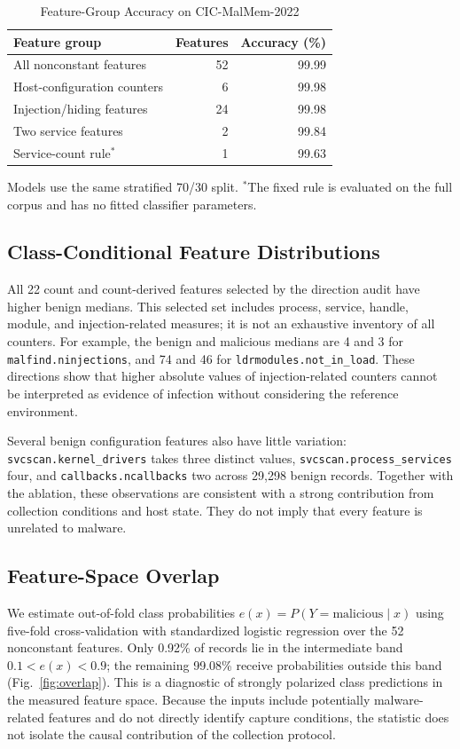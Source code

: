 \documentclass[conference]{IEEEtran}
\begin{document}
\begin{table}[t]
\caption{Feature-Group Accuracy on CIC-MalMem-2022}
\label{tab:ablation}
\centering
\small
\begin{tabular}{@{}lrr@{}}
\toprule
Feature group & Features & Accuracy (\%) \\
\midrule
All nonconstant features & 52 & 99.99 \\
Host-configuration counters & 6 & 99.98 \\
Injection/hiding features & 24 & 99.98 \\
Two service features & 2 & 99.84 \\
Service-count rule$^{\ast}$ & 1 & 99.63 \\
\bottomrule
\end{tabular}
\par\smallskip
\begin{minipage}{\columnwidth}\footnotesize
Models use the same stratified 70/30 split. $^{\ast}$The fixed rule is evaluated
on the full corpus and has no fitted classifier parameters.
\end{minipage}
\end{table}

\subsection{Class-Conditional Feature Distributions}
All 22 count and count-derived features selected by the direction audit have
higher benign medians. This selected set includes process, service, handle,
module, and injection-related measures; it is not an exhaustive inventory of
all counters. For example, the benign and malicious medians are 4 and 3 for
\texttt{malfind.ninjections}, and 74 and 46 for
\texttt{ldrmodules.not\_in\_load}. These directions show that higher absolute
values of injection-related counters cannot be interpreted as evidence of
infection without considering the reference environment.

Several benign configuration features also have little variation:
\texttt{svcscan.kernel\_drivers} takes three distinct values,
\texttt{svcscan.process\_services} four, and
\texttt{callbacks.ncallbacks} two across 29{,}298 benign records.
Together with the ablation, these observations are consistent with a strong
contribution from collection conditions and host state. They do not imply
that every feature is unrelated to malware.

\subsection{Feature-Space Overlap}
We estimate out-of-fold class probabilities
$e(x)=P(Y=\mathrm{malicious}\mid x)$ using five-fold cross-validation with
standardized logistic regression over the 52 nonconstant features. Only 0.92\%
of records lie in the intermediate band $0.1<e(x)<0.9$; the remaining
99.08\% receive probabilities outside this band
(Fig.~\ref{fig:overlap}). This is a diagnostic of strongly polarized class predictions
in the measured feature space. Because the inputs include potentially
malware-related features and do not directly identify capture conditions,
the statistic does not isolate the causal contribution of the collection
protocol.
\end{document}
